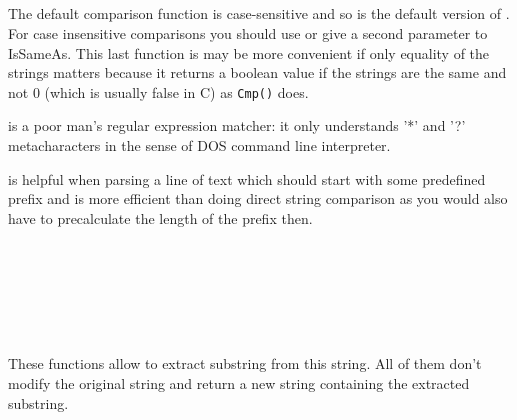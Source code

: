 \\
\\
\\
\\


\label{comparisoninwxstring}

The default comparison function  is case-sensitive and
so is the default version of . For case
insensitive comparisons you should use  or
give a second parameter to IsSameAs. This last function is may be more
convenient if only equality of the strings matters because it returns a boolean
\true value if the strings are the same and not 0 (which is usually false in C)
as {\tt Cmp()} does.

 is a poor man's regular expression matcher:
it only understands '*' and '?' metacharacters in the sense of DOS command line
interpreter.

 is helpful when parsing a line of
text which should start with some predefined prefix and is more efficient than
doing direct string comparison as you would also have to precalculate the
length of the prefix then.

\\
\\
\\
\\
\\


\label{substringextractioninwxstring}

These functions allow to extract substring from this string. All of them don't
modify the original string and return a new string containing the extracted
substring.

\\
\\
\\
\\
\\
\\
\\
\\
\\



